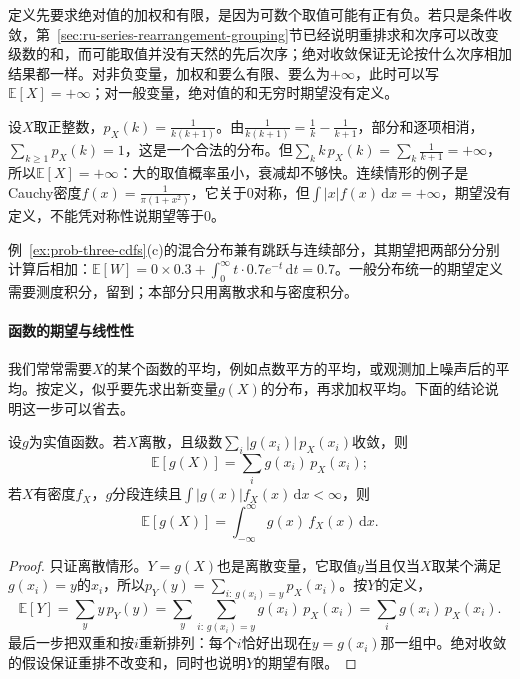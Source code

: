 定义先要求绝对值的加权和有限，是因为可数个取值可能有正有负。若只是条件收敛，第~\ref{sec:ru-series-rearrangement-grouping}节已经说明重排求和次序可以改变级数的和，而可能取值并没有天然的先后次序；绝对收敛保证无论按什么次序相加结果都一样。对非负变量，加权和要么有限、要么为$+\infty$，此时可以写$\mathbb{E}[X]=+\infty$；对一般变量，绝对值的和无穷时期望没有定义。

\begin{example}[期望不存在的分布]
\label{ex:prob-infinite-expectation}
设$X$取正整数，$p_X(k)=\frac{1}{k(k+1)}$。由$\frac{1}{k(k+1)}=\frac1k-\frac1{k+1}$，部分和逐项相消，$\sum_{k\geq1}p_X(k)=1$，这是一个合法的分布。但$\sum_kk\,p_X(k)=\sum_k\frac{1}{k+1}=+\infty$，所以$\mathbb{E}[X]=+\infty$：大的取值概率虽小，衰减却不够快。连续情形的例子是Cauchy密度$f(x)=\frac{1}{\pi(1+x^2)}$，它关于$0$对称，但$\int|x|f(x)\,\mathrm{d}x=+\infty$，期望没有定义，不能凭对称性说期望等于$0$。
\end{example}

例~\ref{ex:prob-three-cdfs}(c)的混合分布兼有跳跃与连续部分，其期望把两部分分别计算后相加：$\mathbb{E}[W]=0\times0.3+\int_0^\infty t\cdot0.7e^{-t}\,\mathrm{d}t=0.7$。一般分布统一的期望定义需要测度积分，留到；本部分只用离散求和与密度积分。

\paragraph{函数的期望与线性性}
我们常常需要$X$的某个函数的平均，例如点数平方的平均，或观测加上噪声后的平均。按定义，似乎要先求出新变量$g(X)$的分布，再求加权平均。下面的结论说明这一步可以省去。

\begin{theorem}[函数的期望]
\label{thm:prob-lotus}
设$g$为实值函数。若$X$离散，且级数$\sum_i|g(x_i)|\,p_X(x_i)$收敛，则
\[
  \mathbb{E}[g(X)]=\sum_ig(x_i)\,p_X(x_i);
\]
若$X$有密度$f_X$，$g$分段连续且$\int|g(x)|f_X(x)\,\mathrm{d}x<\infty$，则
\begin{equation}
  \mathbb{E}[g(X)]=\int_{-\infty}^{\infty}g(x)\,f_X(x)\,\mathrm{d}x .
  \label{eq:prob-lotus}
\end{equation}
\end{theorem}
\begin{proof}
只证离散情形。$Y=g(X)$也是离散变量，它取值$y$当且仅当$X$取某个满足$g(x_i)=y$的$x_i$，所以$p_Y(y)=\sum_{i:\,g(x_i)=y}p_X(x_i)$。按$Y$的定义，
\[
  \mathbb{E}[Y]=\sum_yy\,p_Y(y)=\sum_y\sum_{i:\,g(x_i)=y}g(x_i)\,p_X(x_i)=\sum_ig(x_i)\,p_X(x_i).
\]
最后一步把双重和按$i$重新排列：每个$i$恰好出现在$y=g(x_i)$那一组中。绝对收敛的假设保证重排不改变和，同时也说明$Y$的期望有限。
\end{proof}

